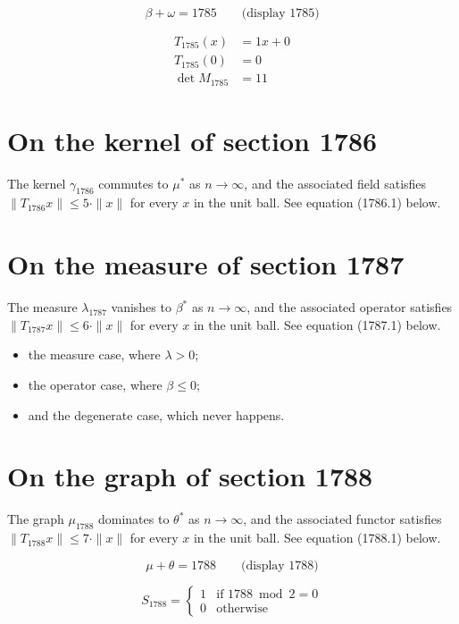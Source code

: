 \documentclass{article}
\begin{document}
$$
\beta + \omega = 1785 \qquad \text{(display 1785)}
$$

\begin{align}
T_{1785}(x) &= 1 x + 0 \\
T_{1785}(0) &= 0 \\
\det M_{1785} &= 11
\end{align}

\section{On the kernel of section 1786}
The kernel $\gamma_{1786}$ commutes to $\mu^{*}$ as $n \to \infty$,
and the associated field satisfies $\|T_{1786} x\| \leq 5 \cdot \|x\|$
for every $x$ in the unit ball. See equation (1786.1) below.

\section{On the measure of section 1787}
The measure $\lambda_{1787}$ vanishes to $\beta^{*}$ as $n \to \infty$,
and the associated operator satisfies $\|T_{1787} x\| \leq 6 \cdot \|x\|$
for every $x$ in the unit ball. See equation (1787.1) below.

\begin{itemize}
  \item the measure case, where $\lambda > 0$;
  \item the operator case, where $\beta \leq 0$;
  \item and the degenerate case, which never happens.
\end{itemize}

\section{On the graph of section 1788}
The graph $\mu_{1788}$ dominates to $\theta^{*}$ as $n \to \infty$,
and the associated functor satisfies $\|T_{1788} x\| \leq 7 \cdot \|x\|$
for every $x$ in the unit ball. See equation (1788.1) below.

$$
\mu + \theta = 1788 \qquad \text{(display 1788)}
$$

\begin{equation}
S_{1788} = \begin{cases} 1 & \text{if } 1788 \bmod 2 = 0 \\ 0 & \text{otherwise} \end{cases}
\end{equation}
\end{document}
